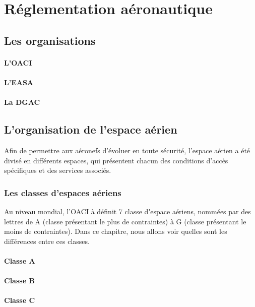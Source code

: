 \section{Réglementation aéronautique}
	\subsection{Les organisations}
		\paragraph{L'OACI}
		
		\paragraph{L'EASA}
		
		\paragraph{La DGAC}
		
			
	
	\subsection{L'organisation de l'espace aérien}
	Afin de permettre aux aéronefs d'évoluer en toute sécurité, l'espace aérien a été divisé en différents espaces, qui présentent chacun des conditions d'accès spécifiques et des services associés.
		
		\subsubsection{Les classes d'espaces aériens}
		Au niveau mondial, l'OACI à définit 7 \glspl{classe d'espace aérien}, nommées par des lettres de A (classe présentant le plus de contraintes) à G (classe présentant le moins de contraintes). Dans ce chapitre, nous allons voir quelles sont les différences entre ces classes.
		
		\paragraph{Classe A}
		
		\paragraph{Classe B}
		
		\paragraph{Classe C}
		
